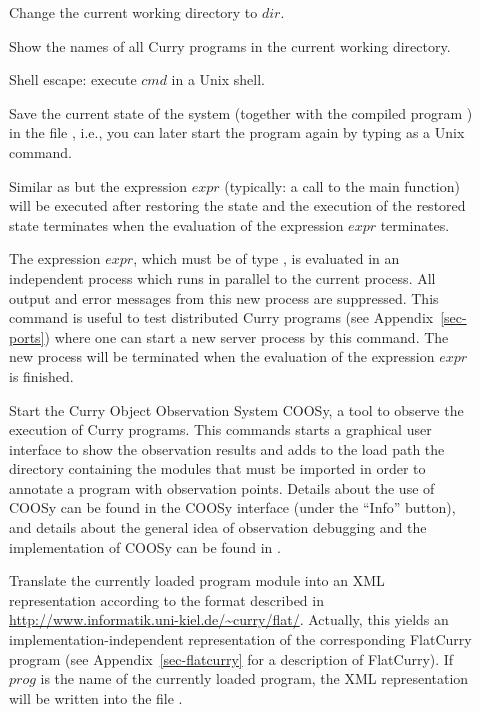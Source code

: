 \begin{description}
\item[]
Change the current working directory to $dir$.

\item[] Show the names of all Curry programs
in the current working directory.

\item[] Shell escape: execute $cmd$ in a Unix shell.

\item[] Save the current state of the system
(together with the compiled program ) in the file
, i.e., you can later start the program again
by typing  as a Unix command.

\item[] Similar as 
but the expression $expr$ (typically: a call to the main
function) will be executed after restoring the state
and the execution of the restored state terminates when
the evaluation of the expression $expr$ terminates.

\item[]
The expression $expr$, which must be of type ,
is evaluated in an independent process which runs in
parallel to the current \CYS process.
All output and error messages from this new process are suppressed.
This command is useful to test distributed Curry programs
(see Appendix~\ref{sec-ports}) where one can start
a new server process by this command. The new process
will be terminated when the evaluation of the expression $expr$
is finished.

\item[]
Start the Curry Object Observation System COOSy,
a tool to observe the execution of Curry programs.
This commands starts a graphical user interface to show
the observation results and adds to the load path the directory
containing the modules that must be imported in order to annotate
a program with observation points.
Details about the use of COOSy can be found in the
COOSy interface (under the ``Info'' button), and details
about the general idea of observation debugging and the implementation
of COOSy can be found in \cite{BrasselChitilHanusHuch04PADL}.

\item[]
Translate the currently loaded program module into an XML representation
according to the format described in
\url{http://www.informatik.uni-kiel.de/~curry/flat/}.
Actually, this yields an implementation-independent
representation of the corresponding FlatCurry program
(see Appendix~\ref{sec-flatcurry} for a description of FlatCurry).
If $prog$ is the name of the currently loaded program,
the XML representation will be written into the file .


\end{description}
